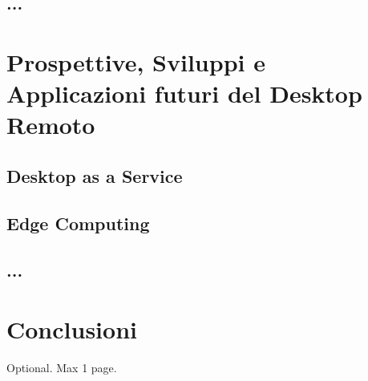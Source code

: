 \documentclass[12pt,a4paper,openright,twoside]{book}
\begin{document}
\section{...}

\chapter{Prospettive, Sviluppi e Applicazioni futuri del Desktop Remoto}

\section{Desktop as a Service}

\section{Edge Computing}

\section{...}

\chapter{Conclusioni}
\label{chap:conclusions}


\backmatter

\nocite{*} %


    

\begin{acknowledgements} %
Optional. Max 1 page.
\end{acknowledgements}
\end{document}
